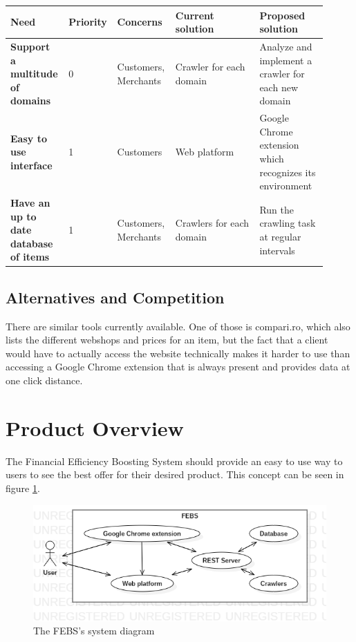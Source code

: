\documentclass[12pt,a4paper,twoside]{report}
\begin{document}
\begin{table}[H]
  \centering
  \begin{tabular}{| m{0.18\linewidth} | m{0.08\linewidth} | m{0.18\linewidth} | m{0.26\linewidth} | m{0.21\linewidth} | }
    \hline
    \rowcolor{lightgray} Need                     & Priority & Concerns             & Current solution         & Proposed solution                                        \\
    \hline
    \textbf{Support a multitude of domains}       & 0        & Customers, Merchants & Crawler for each domain  & Analyze and implement a crawler for each new domain      \\
    \hline
    \textbf{Easy to use interface}                & 1        & Customers            & Web platform             & Google Chrome extension which recognizes its environment \\
    \hline
    \textbf{Have an up to date database of items} & 1        & Customers, Merchants & Crawlers for each domain & Run the crawling task at regular intervals               \\
    \hline
  \end{tabular}
  \label{table:summary_of_key_stakeholder_or_user_needs}
\end{table}


\subsection{Alternatives and Competition}

There are similar tools currently available. One of those is compari.ro, which also lists the different webshops and prices for an item, but the fact that a client would have to actually access the website technically makes it harder to use than accessing a Google Chrome extension that is always present and provides data at one click distance.


\section{Product Overview}

The Financial Efficiency Boosting System should provide an easy to use way to users to see the best offer for their desired product. This concept can be seen in figure \ref{fig:app_system_diagram}.

\begin{figure}[H]
  \centering
  \includegraphics[width=\linewidth]{img/app_system_diagram.png}
  \caption{The FEBS's system diagram}
  \label{fig:app_system_diagram}
\end{figure}
\end{document}
